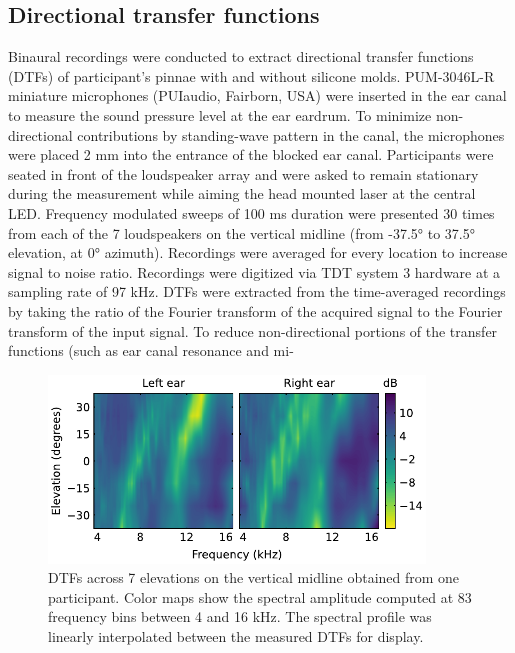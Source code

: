 \subsection{Directional transfer functions}
Binaural recordings were conducted to extract directional transfer functions (DTFs) of participant’s pinnae with and without silicone molds. PUM-3046L-R miniature microphones (PUIaudio, Fairborn, USA) were inserted in the ear canal to measure the sound pressure level at the ear eardrum. To minimize non-directional contributions by standing-wave pattern in the canal, the microphones were placed 2 mm into the entrance of the blocked ear canal. Participants were seated in front of the loudspeaker array and were asked to remain stationary during the measurement while aiming the head mounted laser at the central LED. Frequency modulated sweeps of 100 ms duration were presented 30 times from each of the 7 loudspeakers on the vertical midline (from -37.5° to 37.5° elevation, at 0° azimuth). Recordings were averaged for every location to increase signal to noise ratio. Recordings were digitized via TDT system 3 hardware at a sampling rate of 97 kHz. DTFs were extracted from the time-averaged recordings by taking the ratio of the Fourier transform of the acquired signal to the Fourier transform of the input signal. To reduce non-directional portions of the transfer functions (such as ear canal resonance and mi-\newpage
\begin{figure}
\includegraphics[width=10cm]{../Results/figures/fig1/fig1}
\caption{DTFs across 7 elevations on the vertical midline obtained from one participant. Color maps show the spectral amplitude computed at 83 frequency bins between 4 and 16 kHz. The spectral profile was linearly interpolated between the measured DTFs for display.}
\label{fig:ef_l_r}
\end{figure}
\noindent
